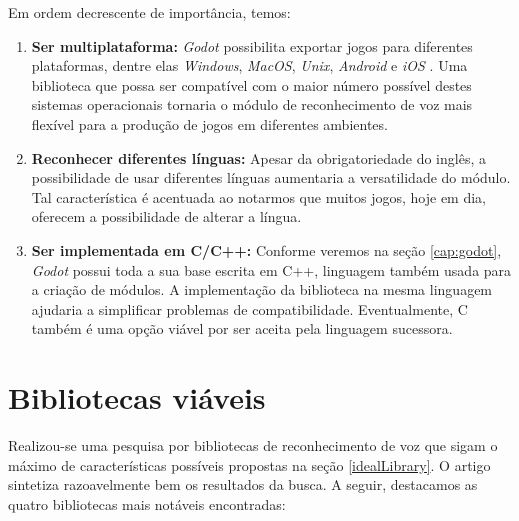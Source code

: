 Em ordem decrescente de importância, temos:

\begin{enumerate}
\item \textbf{Ser multiplataforma:} \textit{Godot} possibilita exportar jogos para diferentes plataformas, dentre elas \textit{Windows}, \textit{MacOS}, \textit{Unix}, \textit{Android} e \textit{iOS} \citep{godotDeployPlatforms}. Uma biblioteca que possa ser compatível com o maior número possível destes sistemas operacionais tornaria o módulo de reconhecimento de voz mais flexível para a produção de jogos em diferentes ambientes.

\item \textbf{Reconhecer diferentes línguas:} Apesar da obrigatoriedade do inglês, a possibilidade de usar diferentes línguas aumentaria a versatilidade do módulo. Tal característica é acentuada ao notarmos que muitos jogos, hoje em dia, oferecem a possibilidade de alterar a língua.

\item \textbf{Ser implementada em C/C++:} Conforme veremos na seção \ref{cap:godot}, \textit{Godot} possui toda a sua base escrita em C++, linguagem também usada para a criação de módulos. A implementação da biblioteca na mesma linguagem ajudaria a simplificar problemas de compatibilidade. Eventualmente, C também é uma opção viável por ser aceita pela linguagem sucessora.
\end{enumerate}


\section{Bibliotecas viáveis}

Realizou-se uma pesquisa por bibliotecas de reconhecimento de voz que sigam o máximo de características possíveis propostas na seção \ref{idealLibrary}. O artigo \citep{sttLibs} sintetiza razoavelmente bem os resultados da busca. A seguir, destacamos as quatro bibliotecas mais notáveis encontradas:

